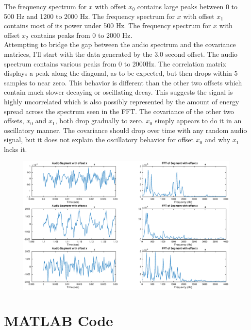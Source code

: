 The frequency spectrum for $x$ with offset $x_0$ contains large peaks between 0 to 500 Hz and 1200 to 2000 Hz. The frequency spectrum for $x$ with offset $x_1$ contains most of its power under 500 Hz. The frequency spectrum for $x$ with offset $x_2$ contains peaks from 0 to 2000 Hz. \\

Attempting to bridge the gap between the audio spectrum and the covariance matrices, I'll start with the data generated by the 3.0 second offset. The audio spectrum contains various peaks from 0 to 2000Hz. The correlation matrix displays a peak along the diagonal, as to be expected, but then drops within 5 samples to near zero.  This behavior is different than the other two offsets which contain much slower decaying or oscillating decay. This suggests the signal is highly uncorrelated which is also possibly represented by the amount of energy spread across the spectrum seen in the FFT. The covariance of the other two offsets, $x_0$ and $x_1$, both drop gradually to zero. $x_0$ simply appears to do it in an oscillatory manner. The covariance should drop over time with any random audio signal, but it does not explain the oscillatory behavior for offset $x_0$ and why $x_1$ lacks it. 

\begin{figure}[H] 
	\centering 
	\includegraphics[width=\linewidth]{plot_5.eps}
	\caption{}
	\label{fig: transform} 
\end{figure}

\section{MATLAB Code} 


